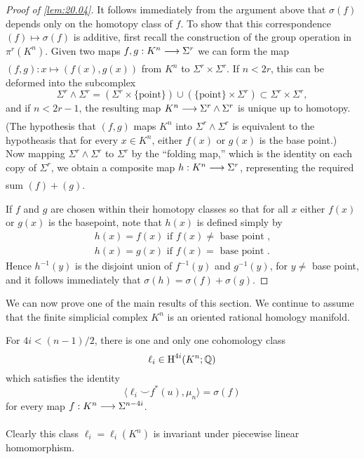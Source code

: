 \documentclass[../main]{subfiles}
\begin{document}
\begin{proof}[Proof of \ref{lem:20.04}]
It follows immediately from the argument above that $\sigma(f)$ depends only on the homotopy class of $f$. To show that this correspondence $(f) \mapsto \sigma(f)$ is additive, first recall the construction of the group operation in $\pi^r(K^n)$. Given two maps $f,g:K^n \varrightarrow{} \Sigma^r$ we can form the map $(f,g):x \mapsto (f(x),g(x))$ from $K^n$ to $\Sigma^r \times \Sigma^r$. If $n<2r$, this can be deformed into the subcomplex \[\Sigma^r \wedge \Sigma^r = (\Sigma^r \times \{\text{point}\}) \cup (\{\text{point}\}\times \Sigma^r) \subset \Sigma^r \times \Sigma^r,\] and if $n < 2r-1$, the resulting map $K^n \varrightarrow{} \Sigma^r \wedge \Sigma^r$ is unique up to homotopy. (The hypothesis that $(f,g)$ maps $K^n$ into $\Sigma^r \wedge \Sigma^r$ is equivalent to the hypotheasis that for every $x \in K^n$, either $f(x)$ or $g(x)$ is the base point.) Now mapping $\Sigma^r \wedge \Sigma^r$ to $\Sigma^r$ by the ``folding map,'' which is the identity on each copy of $\Sigma^r$, we obtain a composite map $h:K^n \varrightarrow{} \Sigma^r$, representing the required sum $(f) + (g)$.

If $f$ and $g$ are chosen within their homotopy classes so that for all $x$ either $f(x)$ or $g(x)$ is the basepoint, note that $h(x)$ is defined simply by \begin{align*} h(x) = f(x) \text{ if }f(x) \neq \text{ base point ,} \\ h(x) = g(x) \text{ if } f(x) = \text{ base point .} \end{align*} Hence $h^{-1}(y)$ is the disjoint union of $f^{-1}(y)$ and $g^{-1}(y)$, for $y \neq$ base point, and it follows immediately that $\sigma(h) = \sigma(f) +\sigma(g)$.
\end{proof}

We can now prove one of the main results of this section. We continue to assume that the finite simplicial complex $K^n$ is an oriented rational homology manifold.

\begin{theorem}
\label{thm:20.06}
For $4i < (n-1)/2$, there is one and only one cohomology class \[\ell_i \in \operatorname{H}^{4i}(K^n;\mathbb{Q}) \] which satisfies the identity \[ \langle \ell_i \smile f^\ast(u), \mu_n \rangle = \sigma(f) \] for every map $f:K^n \varrightarrow{} \Sigma^{n-4i}$.
\end{theorem}

Clearly this class $\ell_i  = \ell_i(K^n)$ is invariant under piecewise linear homomorphism.
\end{document}

